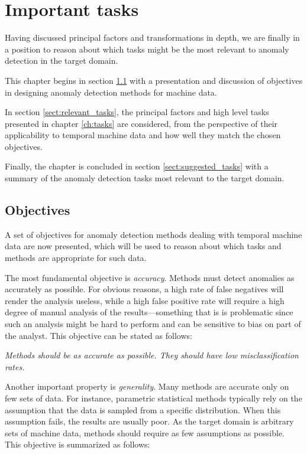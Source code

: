 \chapter{Important tasks}
\label{ch:problems}

Having discussed principal factors and transformations in depth, we are finally in a position to reason about which tasks might be the most relevant to anomaly detection in the target domain.

This chapter begins in section \ref{sect:goals} with a presentation and discussion of objectives in designing anomaly detection methods for machine data.

In section \ref{sect:relevant_tasks}, the principal factors and high level tasks presented in chapter \ref{ch:tasks} are considered, from the perspective of their applicability to temporal machine data and how well they match the chosen objectives.

Finally, the chapter is concluded in section \ref{sect:suggested_tasks} with a summary of the anomaly detection tasks most relevant to the target domain.

\section{Objectives}
\label{sect:goals}

A set of objectives for anomaly detection methods dealing with temporal machine data are now presented, which will be used to reason about which tasks and methods are appropriate for such data.

The most fundamental objective is \emph{accuracy}. Methods must detect anomalies as accurately as possible. For obvious reasons, a high rate of false negatives will render the analysis useless, while a high false positive rate will require a high degree of manual analysis of the results---something that is is problematic since such an analysis might be hard to perform and can be sensitive to bias on part of the analyst. This objective can be stated as follows:

  \emph{Methods should be as accurate as possible. They should have low misclassification rates.}

Another important property is \emph{generality}. Many methods are accurate only on few sets of data. For instance, parametric statistical methods typically rely on the assumption that the data is sampled from a specific distribution. When this assumption fails, the results are usually poor. As the target domain is arbitrary sets of machine data, methods should require as few assumptions as possible. This objective is summarized as follows:


